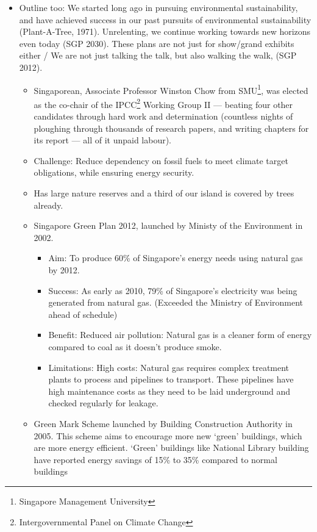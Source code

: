 \documentclass[oneside]{book}
\begin{document}
\begin{enumerate}
\begin{itemize}
        \item Outline too: We started long ago in pursuing environmental sustainability, and have achieved success in our past pursuits of environmental sustainability (Plant-A-Tree, 1971). Unrelenting, we continue working towards new horizons even today (SGP 2030). These plans are not just for show/grand exhibits either / We are not just talking the talk, but also walking the walk, (SGP 2012). 
        \begin{itemize}
            \item Singaporean, Associate Professor Winston Chow from SMU\footnote{Singapore Management University}, was elected as the co-chair of the IPCC\footnote{Intergovernmental Panel on Climate Change
            } Working Group II --- beating four other candidates through hard work and determination \footnotesize(countless nights of ploughing through thousands of research papers, and writing chapters for its report --- all of it unpaid labour)\normalsize.
            \item Challenge: Reduce dependency on fossil fuels to meet climate target obligations, while ensuring energy security.
            \item Has large nature reserves and a third of our island is covered by trees already.
            \item Singapore Green Plan 2012, launched by Ministy of the Environment in 2002. 
            \begin{itemize}
                \item Aim: To produce 60\% of Singapore's energy needs using natural gas by 2012. 
                \item Success: As early as 2010, 79\% of Singapore's electricity was being generated from natural gas. (Exceeded the Ministry of Environment ahead of schedule)
                \item Benefit: Reduced air pollution: Natural gas is a cleaner form of energy compared to coal as it doesn't produce smoke.
                \item Limitations: High costs: Natural gas requires complex treatment plants to process and pipelines to transport. These pipelines have high maintenance costs as they need to be laid underground and checked regularly for leakage. 
            \end{itemize}
            \item Green Mark Scheme launched by Building Construction Authority in 2005. This scheme aims to encourage more new `green' buildings, which are more energy efficient. `Green' buildings like National Library building have reported energy savings of 15\% to 35\% compared to normal buildings

\end{itemize}
\end{itemize}
\end{enumerate}
\end{document}
